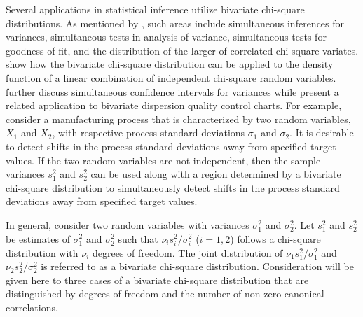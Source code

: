 \documentclass[10pt,letterpaper]{article}
\begin{document}
Several applications in statistical inference utilize
bivariate chi-square distributions.  As mentioned by \cite{Jensen}, such areas
include simultaneous inferences for variances, simultaneous tests in analysis
of variance, simultaneous tests for goodness of fit, and the distribution of
the larger of correlated chi-square variates.  \cite{Gunst} show how the
bivariate chi-square distribution can be applied to the density function of a
linear combination of independent chi-square random variables.
\cite{Jensen69} further discuss simultaneous confidence intervals for
variances while \cite{Tuprah86} present a related application to bivariate
dispersion quality control charts.  For example, consider a manufacturing
process that is characterized by two random variables, $X_1$ and $X_2$, with
respective process standard deviations $\sigma_1$ and $\sigma_2$.
It is desirable to detect shifts in the process
standard deviations away from specified target values.
If the two random variables are not independent, then
the sample variances $s_1^2$ and $s_2^2$ can be used along with a region
determined by a bivariate chi-square distribution to simultaneously 
detect shifts in the process standard
deviations away from specified target values.

In general, consider two random variables with 
variances $\sigma_1^2$ and $\sigma_2^2$.
Let $s_1^2$ and $s_2^2$ be estimates of $\sigma_1^2$ and $\sigma_2^2$ 
such that $\nu_i s_i^2 / \sigma_i^2$ ($i=1,2$) 
follows a chi-square distribution 
with $\nu_i$ degrees of freedom.  The joint distribution of $\nu_1 s_1^2 /
\sigma_1^2$ and $\nu_2 s_2^2 / \sigma_2^2$ is referred to as a bivariate
chi-square distribution.
Consideration will be given here to three cases of a bivariate chi-square
distribution that are distinguished by degrees of freedom and the 
number of non-zero canonical correlations.  
\end{document}
